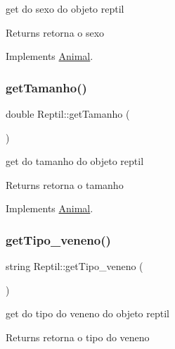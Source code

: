 get do sexo do objeto reptil 

\begin{DoxyReturn}{Returns}
retorna o sexo 
\end{DoxyReturn}


Implements \mbox{\hyperlink{class_animal}{Animal}}.

\mbox{\label{class_reptil_a545c6ffedb7c486a25ce5d318a2c9b4a}} 
\subsubsection{\texorpdfstring{getTamanho()}{getTamanho()}}
{\footnotesize\ttfamily double Reptil\+::get\+Tamanho (\begin{DoxyParamCaption}{ }\end{DoxyParamCaption})\hspace{0.3cm}{\ttfamily [virtual]}}



get do tamanho do objeto reptil 

\begin{DoxyReturn}{Returns}
retorna o tamanho 
\end{DoxyReturn}


Implements \mbox{\hyperlink{class_animal}{Animal}}.

\mbox{\label{class_reptil_a34a5f947f8e81c25bc4302075ff92c85}} 
\subsubsection{\texorpdfstring{getTipo\_veneno()}{getTipo\_veneno()}}
{\footnotesize\ttfamily string Reptil\+::get\+Tipo\+\_\+veneno (\begin{DoxyParamCaption}{ }\end{DoxyParamCaption})}



get do tipo do veneno do objeto reptil 

\begin{DoxyReturn}{Returns}
retorna o tipo do veneno 
\end{DoxyReturn}
\mbox{\label{class_reptil_ab019cf835b02de5053c6240c71d99f8f}} 
